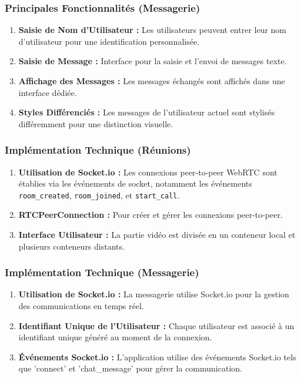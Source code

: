 \documentclass[12pt, a4paper, oneside]{thesis}
\begin{document}
\subsubsection{Principales Fonctionnalités (Messagerie)}
\begin{enumerate}
    \item \textbf{Saisie de Nom d'Utilisateur :} Les utilisateurs peuvent entrer leur nom d'utilisateur pour une identification personnalisée.
    \item \textbf{Saisie de Message :} Interface pour la saisie et l'envoi de messages texte.
    \item \textbf{Affichage des Messages :} Les messages échangés sont affichés dans une interface dédiée.
    \item \textbf{Styles Différenciés :} Les messages de l'utilisateur actuel sont stylisés différemment pour une distinction visuelle.
\end{enumerate}

\subsubsection{Implémentation Technique (Réunions)}
\begin{enumerate}
    \item \textbf{Utilisation de Socket.io :} Les connexions peer-to-peer WebRTC sont établies via les événements de socket, notamment les événements \texttt{room\_created}, \texttt{room\_joined}, et \texttt{start\_call}.
    \item \textbf{RTCPeerConnection :} Pour créer et gérer les connexions peer-to-peer.
    \item \textbf{Interface Utilisateur :} La partie vidéo est divisée en un conteneur local et plusieurs conteneurs distants.
\end{enumerate}

\subsubsection{Implémentation Technique (Messagerie)}
\begin{enumerate}
    \item \textbf{Utilisation de Socket.io :} La messagerie utilise Socket.io pour la gestion des communications en temps réel.
    \item \textbf{Identifiant Unique de l'Utilisateur :} Chaque utilisateur est associé à un identifiant unique généré au moment de la connexion.
    \item \textbf{Événements Socket.io :} L'application utilise des événements Socket.io tels que 'connect' et 'chat\_message' pour gérer la communication.
\end{enumerate}
\end{document}
